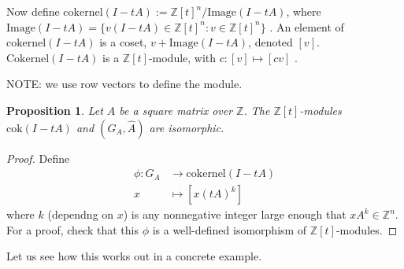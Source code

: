 \documentclass{amsart}
\newtheorem{prop}[equation]{Proposition}
\theoremstyle{definition}
\theoremstyle{definition}
\newcommand{\Z}{\mathbb Z}
\numberwithin{equation}{subsection}
\begin{document}
Now define
$   \text{cokernel}(I-tA) := \Z [t]^n / \text{Image} (I-tA) $,
where
$\text{Image} (I-tA) =
\{v(I-tA)\in \Z [t]^n:
   v\in \Z [t]^n\}  $ .
   An element of $\text{cokernel}(I-tA)$ is a coset,
   $v+ \text{Image} (I-tA)$, denoted $[v]$.
   $   \text{Cokernel}(I-tA)$ is a  $\Z [t]$-module, with
$   c: [v]  \mapsto [cv]$ .

   NOTE: we use row vectors to define the module.

\begin{prop}\label{cokanddirlimiso} Let $A$ be a square matrix over $\Z$.
      The $\Z [t]$-modules $\text{cok}(I-tA)$ and
$(G_A, \hat A)$ are isomorphic.
\end{prop}
\begin{proof}  Define
\begin{align*}
  \phi : G_A & \to \text{cokernel}(I-tA) \\
  x &\mapsto [x(tA)^k]
\end{align*}
where $k$ (dependng on $x$) is any nonnegative integer large enough that
$xA^k\in \Z^n$.  For a proof, check that this $\phi$ is a
well-defined isomorphism of $\Z[t]$-modules.
\end{proof}
Let us see how this works out in a concrete example.
\end{document}
